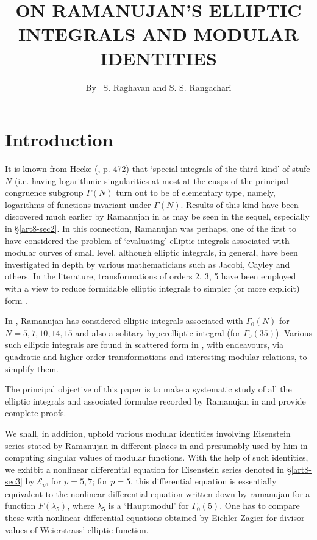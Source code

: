 \title{ON RAMANUJAN'S ELLIPTIC INTEGRALS AND MODULAR IDENTITIES}

\author{By~ S. Raghavan and S. S. Rangachari}

\date{}
\maketitle

\setcounter{page}{138} 
\setcounter{pageoriginal}{118}
\section*{Introduction}\pageoriginale
It is known from Hecke (\cite{art8-key5}, p. 472) that `special integrals of the third kind' of stufe $N$ (i.e. having logarithmic singularities at most at the cusps of the principal congruence subgroup $\Gamma(N)$ turn out to be of elementary type, namely, logarithms of functions invariant under $\Gamma(N)$. Results of this kind have been discovered much earlier by Ramanujan in \cite{art8-key11} as may be seen in the sequel, especially in \S\ref{art8-sec2}. In this connection, Ramanujan was perhaps, one of the first to have considered the problem of `evaluating' elliptic integrals associated with modular curves of small level, although elliptic integrals, in general, have been investigated in depth by various mathematicians such as Jacobi, Cayley and others. In the literature, transformations of orders 2, 3, 5 have been employed with a view to reduce formidable elliptic integrals to simpler (or more explicit) form \cite{art8-key4}.

In \cite{art8-key11}, Ramanujan has considered elliptic integrals associated with $\Gamma_{0}(N)$ for $N=5,7,10,14,15$ and also a solitary hyperelliptic integral (for $\Gamma_{0}(35)$). Various such elliptic integrals are found in scattered form in \cite{art8-key11}, with endeavours, via quadratic and higher order transformations and interesting modular relations, to simplify them.

The principal objective of this paper is to make a systematic study of all the elliptic integrals and associated formulae recorded by Ramanujan in \cite{art8-key11} and provide complete proofs.

We shall, in addition, uphold various modular identities involving Eisenstein series stated by Ramanujan in different places in \cite{art8-key11} and presumably used by him in computing singular values of modular functions. With the help of such identities, we exhibit a nonlinear differential equation for Eisenstein series denoted in \S\ref{art8-sec3} by $\mathscr{E}_{p}$, for $p=5,7$; for $p=5$, this differential equation is essentially equivalent to the nonlinear differential equation written down by ramanujan \cite{art8-key11} for a function $F(\lambda_{5})$, where $\lambda_{5}$ is a `Hauptmodul' for $\Gamma_{0}(5)$. One has to compare these with nonlinear differential equations obtained by Eichler-Zagier \cite{art8-key2} for divisor values of Weierstrass' elliptic function.

